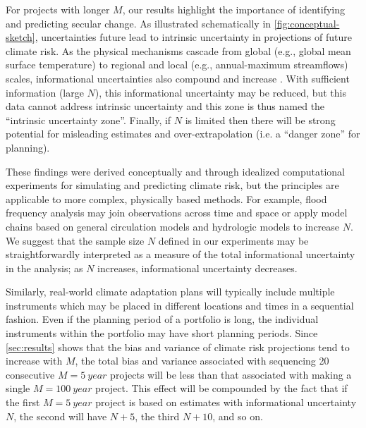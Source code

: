 \documentclass[
  draft,
  linenumbers
]{agujournal2019}
\begin{document}
For projects with longer $M$, our results highlight the importance of identifying and predicting secular change.
As illustrated schematically in \cref{fig:conceptual-sketch},  uncertainties \add{(e.g.\@\xspace, as to} future    lead to  intrinsic uncertainty in projections of future climate risk.
As the physical mechanisms cascade from global (e.g.\@\xspace, global mean surface temperature) to regional  \citep[e.g.\@\xspace, storm track position;][]{Barnes:2015gl} and local (e.g.\@\xspace, annual-maximum streamflows) scales, informational uncertainties also compound and increase \citep{Dittes:2017he}.
With sufficient information (large $N$), this informational uncertainty may be reduced, but this data cannot address intrinsic uncertainty and this zone is thus named the ``intrinsic uncertainty zone''.
Finally, if $N$ is limited then there will be strong potential for misleading estimates and over-extrapolation (i.e.\xspace a ``danger zone'' for planning).

These findings were derived conceptually and through idealized computational experiments for simulating and predicting climate risk, but the principles are applicable to more complex, physically based methods.
For example, flood frequency analysis may join observations across time and space \citep{Lima:2016kd,Merz:2008eh} or apply model chains based on general circulation models and hydrologic models \citep[see][]{Merz:2014gf} to increase $N$.
We suggest that the sample size $N$ defined in our experiments may be straightforwardly interpreted as a measure of the total informational uncertainty in the analysis; as $N$ increases, informational uncertainty decreases.

Similarly, real-world climate adaptation plans will typically include multiple instruments which may be placed in different locations and times in a sequential fashion.
Even if the planning period of a portfolio is long, the individual instruments within the portfolio may have short planning periods.
Since \cref{sec:results} shows that the bias and variance of climate risk projections tend to increase with $M$, the total bias and variance associated with sequencing 20 consecutive $M=\SI{5}{year}$ projects will be less than that associated with making a single $M=\SI{100}{year}$ project.
This effect will be compounded by the fact that if the first $M=\SI{5}{year}$ project is based on estimates with informational uncertainty $N$, the second will have $N+5$, the third $N+10$, and so on.
\end{document}

